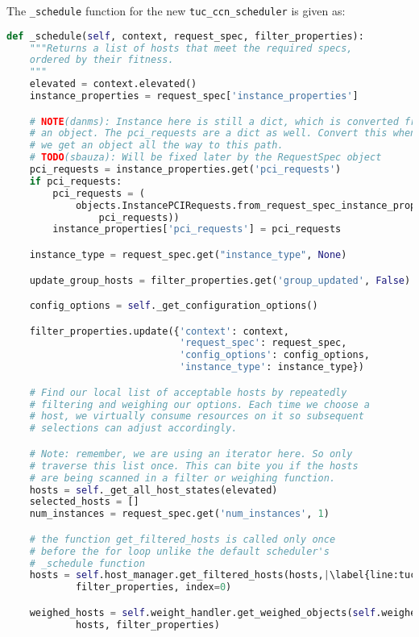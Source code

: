 The \verb|_schedule| function for the new \verb|tuc_ccn_scheduler| is given as:
\newline
\begin{lstlisting}[frame=single, language=Python, caption={The cPlex based TUC\_scheduler's \_schedule function}, label={lst:tuc_schedule}, escapechar=|]
def _schedule(self, context, request_spec, filter_properties):
	"""Returns a list of hosts that meet the required specs,
	ordered by their fitness.
	"""
	elevated = context.elevated()
	instance_properties = request_spec['instance_properties']

	# NOTE(danms): Instance here is still a dict, which is converted from
	# an object. The pci_requests are a dict as well. Convert this when
	# we get an object all the way to this path.
	# TODO(sbauza): Will be fixed later by the RequestSpec object
	pci_requests = instance_properties.get('pci_requests')
	if pci_requests:
		pci_requests = (
			objects.InstancePCIRequests.from_request_spec_instance_props(
				pci_requests))
		instance_properties['pci_requests'] = pci_requests

	instance_type = request_spec.get("instance_type", None)

	update_group_hosts = filter_properties.get('group_updated', False)

	config_options = self._get_configuration_options()

	filter_properties.update({'context': context,
							  'request_spec': request_spec,
							  'config_options': config_options,
							  'instance_type': instance_type})

	# Find our local list of acceptable hosts by repeatedly
	# filtering and weighing our options. Each time we choose a
	# host, we virtually consume resources on it so subsequent
	# selections can adjust accordingly.

	# Note: remember, we are using an iterator here. So only
	# traverse this list once. This can bite you if the hosts
	# are being scanned in a filter or weighing function.
	hosts = self._get_all_host_states(elevated)
	selected_hosts = []
	num_instances = request_spec.get('num_instances', 1)

	# the function get_filtered_hosts is called only once
	# before the for loop unlike the default scheduler's
	# _schedule function
	hosts = self.host_manager.get_filtered_hosts(hosts,|\label{line:tuc_get_filtered_hosts}|
			filter_properties, index=0)

	weighed_hosts = self.weight_handler.get_weighed_objects(self.weighers,
			hosts, filter_properties)


\end{lstlisting}
